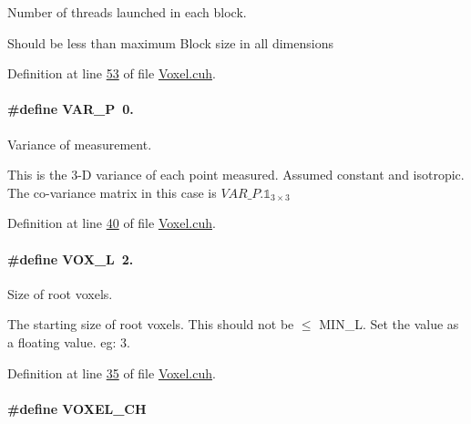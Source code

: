 Number of threads launched in each block. 

Should be less than maximum Block size in all dimensions 

Definition at line \hyperlink{Voxel_8cuh_source_l00053}{53} of file \hyperlink{Voxel_8cuh_source}{Voxel.\+cuh}.

\paragraph[{\texorpdfstring{V\+A\+R\+\_\+P}{VAR_P}}]{\setlength{\rightskip}{0pt plus 5cm}\#define V\+A\+R\+\_\+P~0.}\hypertarget{Voxel_8cuh_ae1cd6283839fc3aebf9bccbd1044a365}{}\label{Voxel_8cuh_ae1cd6283839fc3aebf9bccbd1044a365}


Variance of measurement. 

This is the 3-\/D variance of each point measured. Assumed constant and isotropic. The co-\/variance matrix in this case is $ VAR\_P . \mathbb{1}_{3{\times}3} $ 

Definition at line \hyperlink{Voxel_8cuh_source_l00040}{40} of file \hyperlink{Voxel_8cuh_source}{Voxel.\+cuh}.

\paragraph[{\texorpdfstring{V\+O\+X\+\_\+L}{VOX_L}}]{\setlength{\rightskip}{0pt plus 5cm}\#define V\+O\+X\+\_\+L~2.}\hypertarget{Voxel_8cuh_a3c1c8b966e30fa8ca2de07abe3b3d74a}{}\label{Voxel_8cuh_a3c1c8b966e30fa8ca2de07abe3b3d74a}


Size of root voxels. 

The starting size of root voxels. This should not be $\leq$ M\+I\+N\+\_\+L. Set the value as a floating value. eg\+: 3. 

Definition at line \hyperlink{Voxel_8cuh_source_l00035}{35} of file \hyperlink{Voxel_8cuh_source}{Voxel.\+cuh}.

\paragraph[{\texorpdfstring{V\+O\+X\+E\+L\+\_\+\+CH}{VOXEL_CH}}]{\setlength{\rightskip}{0pt plus 5cm}\#define V\+O\+X\+E\+L\+\_\+\+CH}\hypertarget{Voxel_8cuh_aca76098e63473a0423c740cd04ec72b8}{}\label{Voxel_8cuh_aca76098e63473a0423c740cd04ec72b8}


